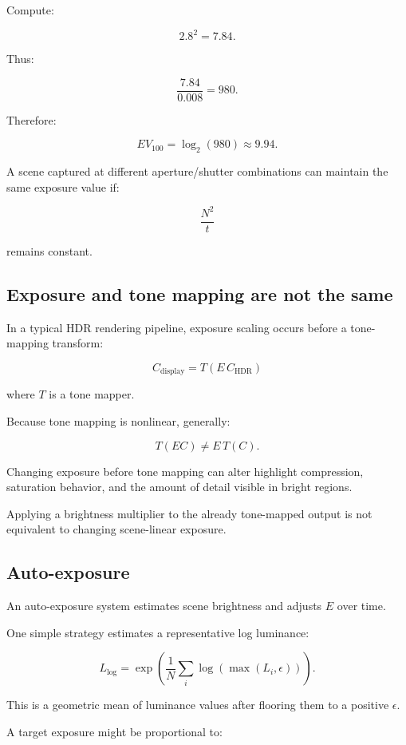 Compute:

\[ 2.8^2=7.84. \]

Thus:

\[ \frac{7.84}{0.008}=980. \]

Therefore:

\[ \boxed{ EV_{100}=\log_2(980)\approx9.94. } \]

A scene captured at different aperture/shutter combinations can maintain the same exposure value if:

\[ \frac{N^2}{t} \]

remains constant.

\subsection{Exposure and tone mapping are not the same}\label{02-foundations-ii-ch036-exposure-and-tone-mapping-are-not-the-same}

In a typical HDR rendering pipeline, exposure scaling occurs before a tone-mapping transform:

\[ \boxed{ C_{\mathrm{display}} = T(E\,C_{\mathrm{HDR}}) } \]

where \(T\) is a tone mapper.

Because tone mapping is nonlinear, generally:

\[ T(EC)\ne E\,T(C). \]

Changing exposure before tone mapping can alter highlight compression, saturation behavior, and the amount of detail visible in bright regions.

Applying a brightness multiplier to the already tone-mapped output is not equivalent to changing scene-linear exposure.

\subsection{Auto-exposure}\label{02-foundations-ii-ch036-auto-exposure}

An auto-exposure system estimates scene brightness and adjusts \(E\) over time.

One simple strategy estimates a representative log luminance:

\[ \boxed{ L_{\log} = \exp\left( \frac1N\sum_i\log(\max(L_i,\epsilon)) \right). } \]

This is a geometric mean of luminance values after flooring them to a positive \(\epsilon\).

A target exposure might be proportional to:

